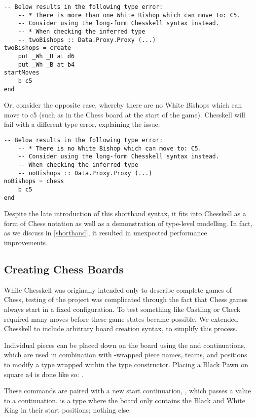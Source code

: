 \begin{lstlisting}
-- Below results in the following type error:
    -- * There is more than one White Bishop which can move to: C5.
    -- Consider using the long-form Chesskell syntax instead.
    -- * When checking the inferred type
    -- twoBishops :: Data.Proxy.Proxy (...)
twoBishops = create
    put _Wh _B at d6
    put _Wh _B at b4
startMoves
    b c5
end
\end{lstlisting}

Or, consider the opposite case, whereby there are no White Bishops which can move to c5 (such as in the Chess board at the start of the game). Chesskell will fail with a different type error, explaining the issue:

\begin{lstlisting}
-- Below results in the following type error:
    -- * There is no White Bishop which can move to: C5.
    -- Consider using the long-form Chesskell syntax instead.
    -- When checking the inferred type
    -- noBishops :: Data.Proxy.Proxy (...)
noBishops = chess
    b c5
end
\end{lstlisting}

Despite the late introduction of this shorthand syntax, it fits into Chesskell as a form of Chess notation as well as a demonstration of type-level modelling. In fact, as we discuss in \cref{shorthand}, it resulted in unexpected performance improvements.

\subsection{Creating Chess Boards} \label{boardcreation}

While Chesskell was originally intended only to describe complete games of Chess, testing of the project was complicated through the fact that Chess games always start in a fixed configuration. To test something like Castling or Check required many moves before these game states became possible. We extended Chesskell to include arbitrary board creation syntax, to simplify this process.

Individual pieces can be placed down on the board using the  and  continuations, which are used in combination with -wrapped piece names, teams, and positions to modify a  type wrapped within the  type constructor. Placing a Black Pawn on square a4 is done like so: .

These commands are paired with a new start continuation, , which passes a  value to a continuation.  is a  type where the board only contains the Black and White King in their start positions; nothing else.

